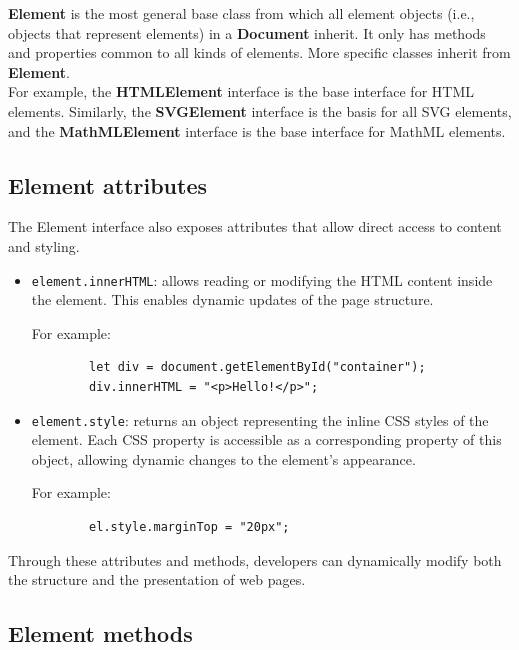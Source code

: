 \documentclass{scrbook}
\begin{document}
	\textbf{Element} is the most general base class from which all element objects (i.e., objects that represent elements) in a \textbf{Document} inherit. It only has methods and properties common to all kinds of elements. More specific classes inherit from \textbf{Element}.\\
	
	For example, the \textbf{HTMLElement} interface is the base interface for HTML elements. Similarly, the \textbf{SVGElement} interface is the basis for all SVG elements, and the \textbf{MathMLElement} interface is the base interface for MathML elements.
	
	\subsection{Element attributes}
	
	The Element interface also exposes attributes that allow direct access to content and styling.
	
	\begin{itemize}
		\item \texttt{element.innerHTML}: allows reading or modifying the HTML content inside the element. This enables dynamic updates of the page structure.
		
		For example:
		
		\begin{lstlisting}
		let div = document.getElementById("container");
		div.innerHTML = "<p>Hello!</p>";
		\end{lstlisting}
		
		\item \texttt{element.style}: returns an object representing the inline CSS styles of the element. Each CSS property is accessible as a corresponding property of this object, allowing dynamic changes to the element's appearance.
		
		For example:
		
		\begin{lstlisting}
		el.style.marginTop = "20px";
		\end{lstlisting}
	\end{itemize}
	
	Through these attributes and methods, developers can dynamically modify both the structure and the presentation of web pages.
	
	\subsection{Element methods}
	
\end{document}
